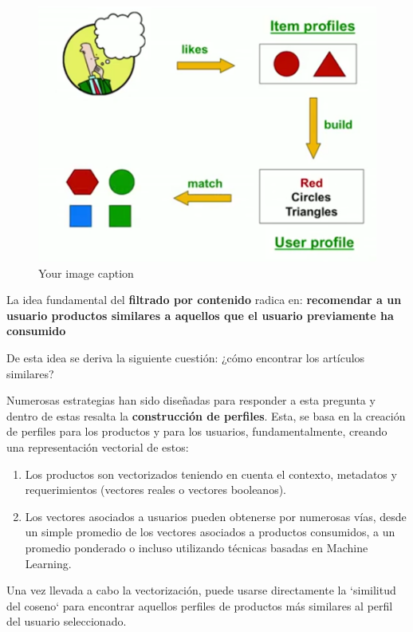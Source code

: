 \documentclass[14pt]{extarticle}
\begin{document}
\begin{figure}[htbp]
    \centering
    \includegraphics[width=\textwidth]{./images/content-bases_filtering.png}
    \caption{Your image caption}
    \label{fig:your-image-label}
\end{figure}


La idea fundamental del \textbf{filtrado por contenido} radica en: \textbf{recomendar a un usuario productos similares a aquellos que el usuario previamente ha consumido}

De esta idea se deriva la siguiente cuestión: ¿cómo encontrar los artículos similares?

Numerosas estrategias han sido diseñadas para responder a esta pregunta y dentro de estas resalta la \textbf{construcción de perfiles}. Esta, se basa en la creación de perfiles para los productos y para los usuarios, fundamentalmente, creando una representación vectorial de estos:

\begin{enumerate}
    \item Los productos son vectorizados teniendo en cuenta el contexto, metadatos y requerimientos (vectores reales o vectores booleanos).
    \item Los vectores asociados a usuarios pueden obtenerse por numerosas vías, desde un simple promedio de los vectores asociados a productos consumidos, a un promedio ponderado o incluso utilizando técnicas basadas en Machine Learning.
\end{enumerate}

Una vez llevada a cabo la vectorización, puede usarse directamente la `similitud del coseno` para encontrar aquellos perfiles de productos más similares al perfil del usuario seleccionado.
\end{document}
